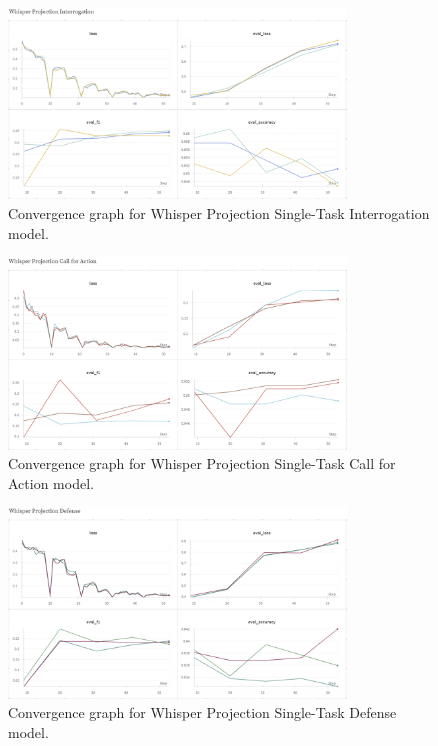 \documentclass{article}
\begin{document}
\begin{figure}[H]
    \centering
    \includegraphics[width=0.8\textwidth]{convergence_graphs/whisper_proj_interrogation.png}
    \caption{Convergence graph for Whisper Projection Single-Task Interrogation model.}
    \label{fig:whisper_proj_interrogation}
\end{figure}

\begin{figure}[H]
    \centering
    \includegraphics[width=0.8\textwidth]{convergence_graphs/whisper_proj_call_for_action.png}
    \caption{Convergence graph for Whisper Projection Single-Task Call for Action model.}
    \label{fig:whisper_proj_call_for_action}
\end{figure}

\begin{figure}[H]
    \centering
    \includegraphics[width=0.8\textwidth]{convergence_graphs/whisper_proj_defense.png}
    \caption{Convergence graph for Whisper Projection Single-Task Defense model.}
    \label{fig:whisper_proj_defense}
\end{figure}
\end{document}
